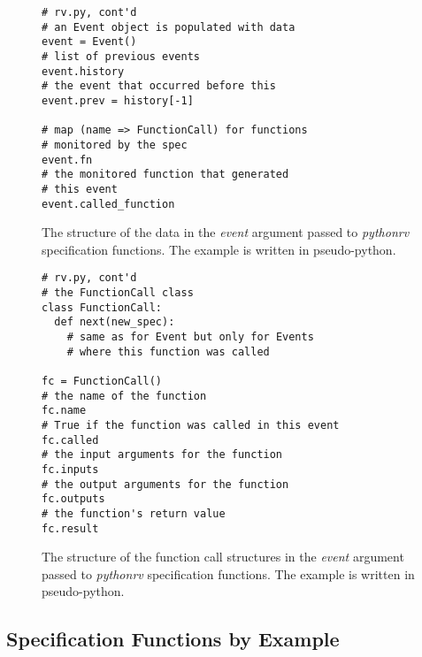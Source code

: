 \begin{figure}[h!]
	\begin{center}
	\begin{minipage}{0.7\textwidth}
	\begin{lstlisting}
# rv.py, cont'd
# an Event object is populated with data
event = Event()
# list of previous events
event.history
# the event that occurred before this
event.prev = history[-1]

# map (name => FunctionCall) for functions
# monitored by the spec
event.fn
# the monitored function that generated
# this event
event.called_function
	\end{lstlisting}
	\end{minipage}
	\end{center}

  \caption{The structure of the data in the \textit{event} argument passed to
    \textit{pythonrv} specification functions. The example is written in
    pseudo-python.}
	\label{figure-event-data}
\end{figure}

\begin{figure}[h!]
	\begin{center}
	\begin{minipage}{0.7\textwidth}
	\begin{lstlisting}
# rv.py, cont'd
# the FunctionCall class
class FunctionCall:
  def next(new_spec):
    # same as for Event but only for Events
    # where this function was called

fc = FunctionCall()
# the name of the function
fc.name
# True if the function was called in this event
fc.called
# the input arguments for the function
fc.inputs
# the output arguments for the function
fc.outputs
# the function's return value
fc.result
	\end{lstlisting}
	\end{minipage}
	\end{center}

  \caption{The structure of the function call structures in the \textit{event}
    argument passed to \textit{pythonrv} specification functions. The example
    is written in pseudo-python.}
	\label{figure-event-function-call}
\end{figure}



\clearpage
\subsection{Specification Functions by Example}
\lstset{language=Python,numbers=left}

